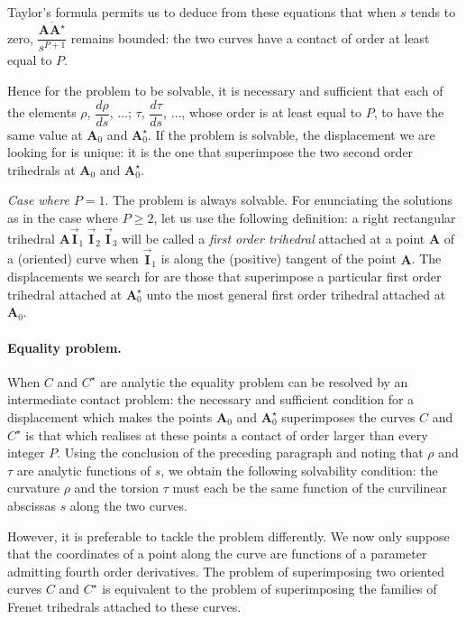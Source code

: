 \documentclass[leqno,11pt]{book}
\numberwithin{equation}{chapter}
\theoremstyle{shape1}
\theoremstyle{shapesmall}
\newcommand{\rvec}[1]{\vec{\mathbf{#1}}}
\newcommand{\ivec}{\rvec{I}}
\newcommand{\somespace}{\vspace{9pt}}
\begin{document}
Taylor's formula permits us to deduce from these equations that when $s$ tends to zero, $\dfrac{\overline{\mathbf{AA}^{\star}}}{s^{P+1}}$ remains bounded: the two curves have a contact of order at least equal to $P$.

Hence for the problem to be solvable, it is necessary and sufficient that each of the elements $\rho$, $\dfrac{d\rho}{ds}$, $\dots$; $\tau$, $\dfrac{d\tau}{ds}$, $\dots$, whose order is at least equal to $P$, to have the same value at $\mathbf{A}_{0}$ and $\mathbf{A}_{0}^{\star}$. If the problem is solvable, the displacement we are looking for is unique: it is the one that superimpose the two second order trihedrals at $\mathbf{A}_{0}$ and $\mathbf{A}_{0}^{\star}$.

\somespace

\emph{Case where $P=1$}. The problem is always solvable. For enunciating the solutions as in the case where $P\ge 2$, let us use the following definition: a right rectangular trihedral $\mathbf{A}\ivec_{1}\ \ivec_{2}\ \ivec_{3}$ will be called a \emph{first order trihedral} attached at a point $\mathbf{A}$ of a (oriented) curve when $\ivec_{1}$ is along the (positive) tangent of the point $\mathbf{A}$. The displacements we search for are those that superimpose a particular first order trihedral attached at $\mathbf{A}_{0}^{\star}$ unto the most general first order trihedral attached at $\mathbf{A}_{0}$.

\paragraph{Equality problem.}
\label{sec:13}
When $C$ and $C^{\star}$ are analytic the equality problem can be resolved by an intermediate contact problem: the necessary and sufficient condition for a displacement which makes the points $\mathbf{A}_{0}$ and $\mathbf{A}_{0}^{\star}$ superimposes the curves $C$ and $C^{\star}$ is that which realises at these points a contact of order larger than every integer $P$. Using the conclusion of the preceding paragraph and noting that $\rho$ and $\tau$ are analytic functions of $s$, we obtain the following solvability condition: the curvature $\rho$ and the torsion $\tau$ must each be the same function of the curvilinear abscissas $s$ along the two curves.

However, it is preferable to tackle the problem differently. We now only suppose that the coordinates of a point along the curve are functions of a parameter admitting fourth order derivatives. The problem of superimposing two oriented curves $C$ and $C^{\star}$ is equivalent to the problem of superimposing the families of Frenet trihedrals attached to these curves.
\end{document}
